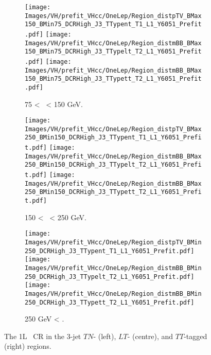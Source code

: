 \begin{figure}[h!]
    \centering
    \begin{subfigure}[b]{\textwidth}
        \centering
        \texttt{[image: Images/VH/prefit\_VHcc/OneLep/Region\_distpTV\_BMax150\_BMin75\_DCRHigh\_J3\_TTypent\_T1\_L1\_Y6051\_Prefit.pdf]}
        \texttt{[image: Images/VH/prefit\_VHcc/OneLep/Region\_distmBB\_BMax150\_BMin75\_DCRHigh\_J3\_TTypelt\_T2\_L1\_Y6051\_Prefit.pdf]}
        \texttt{[image: Images/VH/prefit\_VHcc/OneLep/Region\_distmBB\_BMax150\_BMin75\_DCRHigh\_J3\_TTypett\_T2\_L1\_Y6051\_Prefit.pdf]}
        \caption{75 < \ptv\ < 150 GeV.}
        \label{fig:plots_VHcc_1L_75_CRH_3J}
    \end{subfigure}
    \begin{subfigure}[b]{\textwidth}
        \centering
        \texttt{[image: Images/VH/prefit\_VHcc/OneLep/Region\_distpTV\_BMax250\_BMin150\_DCRHigh\_J3\_TTypent\_T1\_L1\_Y6051\_Prefit.pdf]}
        \texttt{[image: Images/VH/prefit\_VHcc/OneLep/Region\_distmBB\_BMax250\_BMin150\_DCRHigh\_J3\_TTypelt\_T2\_L1\_Y6051\_Prefit.pdf]}
        \texttt{[image: Images/VH/prefit\_VHcc/OneLep/Region\_distmBB\_BMax250\_BMin150\_DCRHigh\_J3\_TTypett\_T2\_L1\_Y6051\_Prefit.pdf]}
        \caption{150 < \ptv\ < 250 GeV.}
        \label{fig:plots_VHcc_1L_150_CRH_3J}
    \end{subfigure}
    \begin{subfigure}[b]{\textwidth}
        \centering
        \texttt{[image: Images/VH/prefit\_VHcc/OneLep/Region\_distpTV\_BMin250\_DCRHigh\_J3\_TTypent\_T1\_L1\_Y6051\_Prefit.pdf]}
        \texttt{[image: Images/VH/prefit\_VHcc/OneLep/Region\_distmBB\_BMin250\_DCRHigh\_J3\_TTypelt\_T2\_L1\_Y6051\_Prefit.pdf]}
        \texttt{[image: Images/VH/prefit\_VHcc/OneLep/Region\_distmBB\_BMin250\_DCRHigh\_J3\_TTypett\_T2\_L1\_Y6051\_Prefit.pdf]}
        \caption{250 GeV < \ptv.}
        \label{fig:plots_VHcc_1L_250_CRH_3J}
    \end{subfigure}
    \caption{The 1L \highdr\ CR in the 3-jet $TN$- (left), $LT$- (centre), and $TT$-tagged (right) regions.}
    \label{fig:plots_VHcc_1L_CRH_3J}
\end{figure}

\vspace*{\fill} \newpage
\vspace*{\fill} 

